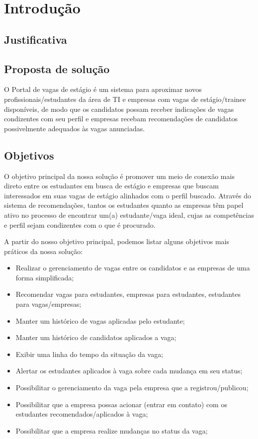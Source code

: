 
\chapter[Introdução]{Introdução}


\section{Justificativa}

\section{Proposta de solução}
O Portal de vagas de estágio é um sistema para aproximar novos profissionais/estudantes da área de TI e empresas com vagas de estágio/trainee disponíveis, de modo que os candidatos possam receber indicações de vagas condizentes com seu perfil e empresas recebam recomendações de candidatos possivelmente adequados às vagas anunciadas.

\section{Objetivos}
O objetivo principal da nossa solução é promover um meio de conexão mais direto entre os estudantes em busca de estágio e empresas que buscam interessados em suas vagas de estágio alinhados com o perfil buscado. Através do sistema de recomendações, tantos os estudantes quanto as empresas têm papel ativo no processo de encontrar um(a) estudante/vaga ideal, cujas as competências e perfil sejam condizentes com o que é procurado.

A partir do nosso objetivo principal, podemos listar alguns objetivos mais práticos da nossa solução:
\begin{itemize}
	\item Realizar o gerenciamento de vagas entre os candidatos e as empresas de uma forma simplificada;
	\item Recomendar vagas para estudantes, empresas para estudantes, estudantes para vagas/empresas;
	\item Manter um histórico de vagas aplicadas pelo estudante;
	\item Manter um histórico de candidatos aplicados a vaga;
	\item Exibir uma linha do tempo da situação da vaga;
	\item Alertar os estudantes aplicados à vaga sobre cada mudança em seu status;
	\item Possibilitar o gerenciamento da vaga pela empresa que a registrou/publicou;
	\item Possibilitar que a empresa possas acionar (entrar em contato) com os estudantes recomendados/aplicados à vaga;
	\item Possibilitar que a empresa realize mudanças no status da vaga;
\end{itemize}
	
